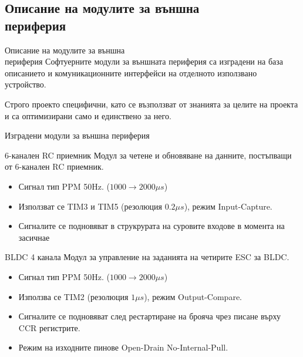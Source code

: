 \documentclass[handout]{beamer}
\begin{document}
\subsection{Описание на модулите за външна\\периферия}

\begin{frame}{Описание на модулите за външна\\периферия}
	\pause
	Софтуерните модули за външната периферия са изградени на база описанието и комуникационните интерфейси на отделното използвано устройство.
	
	
	Строго проекто специфични, като се възползват от знанията за целите на проекта и са оптимизирани само и единствено за него.

\end{frame}

\begin{frame}{Изградени модули за външна периферия}
	\begin{block}{6-канален RC приемник}
		Модул за четене и обновяване на данните, постъпващи от 6-канален RC приемник.
		\begin{itemize}
			\item Сигнал тип PPM 50Hz. (\(1000\to2000\mu s\))
			\item Използват се TIM3 и TIM5 (резолюция \(0.2\mu s\)), режим Input-Capture.
			\item Сигналите се подновяват в струкрурата на суровите входове в момента на засичнае
		\end{itemize}
	\end{block}

\end{frame}


\begin{frame}[t]
	\begin{block}{BLDC 4 канала}
		Модул за управление на заданията на четирите ESC за BLDC.
		\begin{itemize}
			\item Сигнал тип PPM 50Hz. (\(1000\to2000\mu s\))
			\item Използва се TIM2 (резолюция \(1\mu s\)), режим Output-Compare.
			\item Сигналите се подновяват след рестартиране на брояча чрез писане върху CCR регистрите.
			\item Режим на изходните пинове Open-Drain No-Internal-Pull.
		\end{itemize}
	\end{block}
\end{frame}
\end{document}
